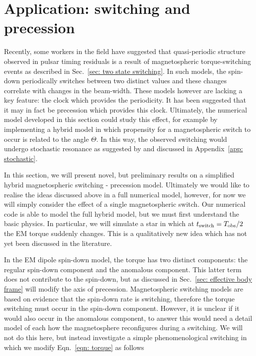 \documentclass[../full_thesis/full_thesis.tex]{subfiles}
\begin{document}
\section{Application: switching and precession}

Recently, some workers in the field \citep{Lyne2010, Perera2015} have suggested
that quasi-periodic structure observed in pulsar timing residuals is a result
of magnetospheric torque-switching events as described in Sec.~\ref{sec: two
state switching}. In such models, the spin-down periodically switches between
two distinct values and these changes correlate with changes in the beam-width.
These models however are lacking a key feature: the clock which provides the
periodicity. It has been suggested \citep{Jones2012} that it may in fact be
precession which provides this clock. Ultimately, the numerical model developed
in this section could study this effect, for example by implementing a hybrid
model in which propensity for a magnetospheric switch to occur is related to
the angle $\Theta$. In this way, the observed switching would undergo
stochastic resonance as suggested by \citet{Cordes2013} and discussed in Appendix~\ref{app:
stochastic}.

In this section, we will present novel, but preliminary results on a simplified
hybrid magnetospheric switching - precession model. Ultimately we would like to
realise the ideas discussed above in a full numerical model, however, for now
we will simply consider the effect of a single magnetospheric switch. Our numerical
code is able to model the full hybrid model, but we must first understand the
basic physics. In particular, we will simulate a star in which at
$t_{\mathrm{switch}} = T_{\textrm{obs}}/2$ the EM torque suddenly changes. This is a qualitatively
new idea which has not yet been discussed in the literature.

In the EM dipole spin-down model, the torque has two distinct components: the
regular spin-down component and the anomalous component. This latter term
does not contribute to the spin-down, but as discussed in Sec.~\ref{sec: effective
body frame} will modify the axis of precession. Magnetospheric switching models
are based on evidence that the spin-down rate is switching, therefore the torque
switching must occur in the spin-down component. However, it is unclear if it would
also occur in the anomalous component, to answer this would need a detail model
of each how the magnetosphere reconfigures during a switching. We will not do
this here, but instead investigate a simple phenomenological switching in which we
modify Eqn.~\eqref{eqn: torque} as follows
\newcommand{\Ss}{S_{\mathrm{S}}}
\newcommand{\Sa}{S_{\mathrm{A}}}
\end{document}
